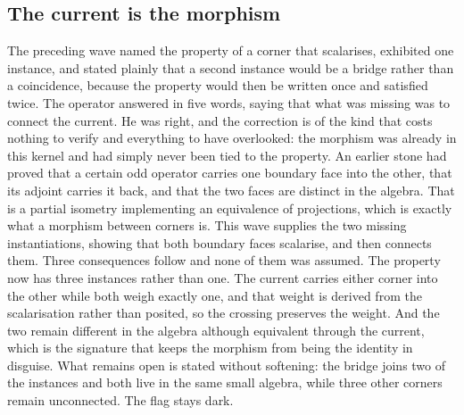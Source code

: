 \documentclass[11pt]{article}
\theoremstyle{definition}\newtheorem{deriv}{Derivation}
\begin{document}
\subsection*{The current is the morphism}The preceding wave named the property of a corner that scalarises, exhibited one instance, and stated plainly that a second instance would be a bridge rather than a coincidence, because the property would then be written once and satisfied twice. The operator answered in five words, saying that what was missing was to connect the current. He was right, and the correction is of the kind that costs nothing to verify and everything to have overlooked: the morphism was already in this kernel and had simply never been tied to the property. An earlier stone had proved that a certain odd operator carries one boundary face into the other, that its adjoint carries it back, and that the two faces are distinct in the algebra. That is a partial isometry implementing an equivalence of projections, which is exactly what a morphism between corners is. This wave supplies the two missing instantiations, showing that both boundary faces scalarise, and then connects them. Three consequences follow and none of them was assumed. The property now has three instances rather than one. The current carries either corner into the other while both weigh exactly one, and that weight is derived from the scalarisation rather than posited, so the crossing preserves the weight. And the two remain different in the algebra although equivalent through the current, which is the signature that keeps the morphism from being the identity in disguise. What remains open is stated without softening: the bridge joins two of the instances and both live in the same small algebra, while three other corners remain unconnected. The flag stays dark.
\end{document}
